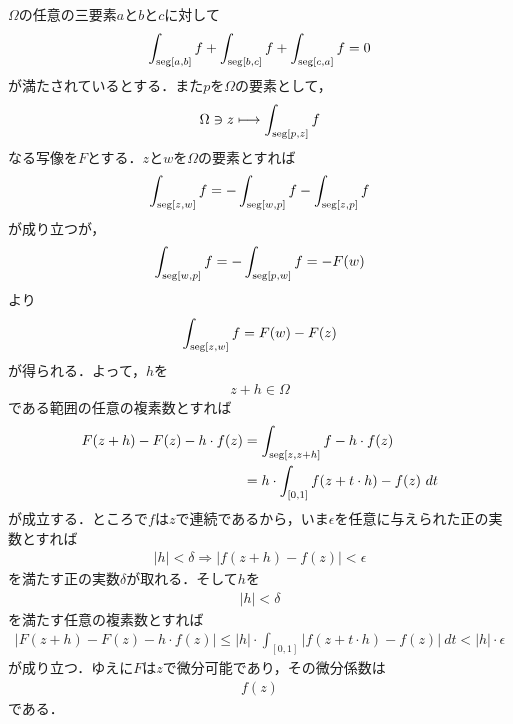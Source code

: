 	\begin{sketch}
		$\Omega$の任意の三要素$a$と$b$と$c$に対して
		\begin{align}
			\int_{\operatorname{seg}[a,b]} f + \int_{\operatorname{seg}[b,c]} f + \int_{\operatorname{seg}[c,a]} f = 0
		\end{align}
		が満たされているとする．また$p$を$\Omega$の要素として，
		\begin{align}
			\Omega \ni z \longmapsto \int_{\operatorname{seg}[p,z]} f
		\end{align}
		なる写像を$F$とする．$z$と$w$を$\Omega$の要素とすれば
		\begin{align}
			\int_{\operatorname{seg}[z,w]} f = -\int_{\operatorname{seg}[w,p]} f - \int_{\operatorname{seg}[z,p]} f
		\end{align}
		が成り立つが，
		\begin{align}
			\int_{\operatorname{seg}[w,p]} f = -\int_{\operatorname{seg}[p,w]} f = -F(w)
		\end{align}
		より
		\begin{align}
			\int_{\operatorname{seg}[z,w]} f = F(w) - F(z)
		\end{align}
		が得られる．よって，$h$を
		\begin{align}
			z + h \in \Omega
		\end{align}
		である範囲の任意の複素数とすれば
		\begin{align}
			F(z+h) - F(z) - h \cdot f(z)
			&= \int_{\operatorname{seg}[z,z+h]} f - h \cdot f(z) \\
			&= h \cdot \int_{[0,1]} f(z + t \cdot h) - f(z)\ dt
		\end{align}
		が成立する．ところで$f$は$z$で連続であるから，いま$\epsilon$を任意に与えられた正の実数とすれば
		\begin{align}
			|h| < \delta \Longrightarrow |f(z+h) - f(z)| < \epsilon
		\end{align}
		を満たす正の実数$\delta$が取れる．そして$h$を
		\begin{align}
			|h| < \delta
		\end{align}
		を満たす任意の複素数とすれば
		\begin{align}
			|F(z+h) - F(z) - h \cdot f(z)|
			\leq |h| \cdot \int_{[0,1]} |f(z + t \cdot h) - f(z)|\ dt
			< |h| \cdot \epsilon
		\end{align}
		が成り立つ．ゆえに$F$は$z$で微分可能であり，その微分係数は
		\begin{align}
			f(z)
		\end{align}
		である．
		\QED
	\end{sketch}